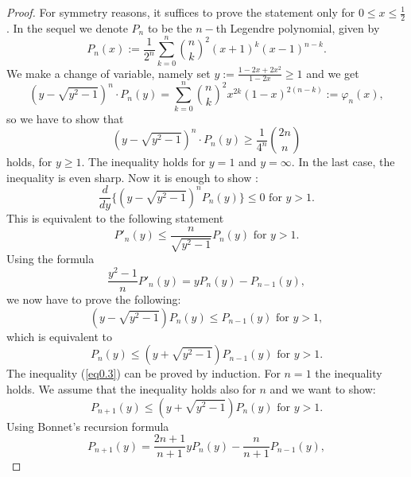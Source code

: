 \documentclass[12pt,leqno,a4paper,dvips,twoside]{article}
\begin{document}
{\begin{proof}
	For symmetry reasons, it suffices to prove the statement only for $0\leq x\leq\frac{1}{2}$. 
	In the sequel we denote $P_n$ to be the $n-$th Legendre polynomial, given by
		\begin{equation*}
			P_n(x):=\frac{1}{2^n}\sum^{n}_{k=0}{\binom{n}{k}}^2(x+1)^k(x-1)^{n-k}.
		\end{equation*}
	We make a change of variable, namely set $y:=\frac{1-2x+2x^2}{1-2x}\geq 1$ and we get
		\begin{equation*}
			(y-\sqrt{y^2-1})^n\cdot P_n(y)=\sum^{n}_{k=0}{\binom{n}{k}}^2x^{2k}(1-x)^{2(n-k)}:=\varphi_n(x),
		\end{equation*}
	so we have to show that
		\begin{equation*}
			(y-\sqrt{y^2-1})^n\cdot P_n(y)\geq \frac{1}{4^n}\binom{2n}{n}
		\end{equation*}
	holds, for $y\geq 1$. The inequality holds for $y=1$ and $y=\infty$. In the last case, the inequality is even sharp. 
	Now it is enough to show :
		\begin{equation*}
			\frac{d}{dy}\{(y-\sqrt{y^2-1})^nP_n(y)\}\leq 0 \text{ for } y>1. 
		\end{equation*}
	This is equivalent to the following statement
		\begin{equation*}
			P'_n(y)\leq \frac{n}{\sqrt{y^2-1}}P_n(y) \text{ for } y>1.
		\end{equation*}
	Using the formula
		\begin{equation*}
			\frac{y^2-1}{n}P'_n(y)=yP_n(y)-P_{n-1}(y),
		\end{equation*}
	we now have to prove the following:
		\begin{equation*}
			(y-\sqrt{y^2-1})P_n(y)\leq P_{n-1}(y) \text{ for } y>1,
		\end{equation*}
	which is equivalent to
		\begin{equation}\label{eq0.3}
			P_n(y)\leq (y+\sqrt{y^2-1})P_{n-1}(y) \text{ for } y>1.
		\end{equation}
	The inequality (\ref{eq0.3}) can be proved by induction. For $n=1$ the inequality holds. We assume that the inequality holds also for $n$ and 
	we want to show:
		\begin{equation*}
			P_{n+1}(y)\leq (y+\sqrt{y^2-1})P_n(y) \text{ for } y>1.
		\end{equation*}
	Using Bonnet's recursion formula
		\begin{equation*}
			P_{n+1}(y)=\frac{2n+1}{n+1}yP_n(y)-\frac{n}{n+1}P_{n-1}(y),
		\end{equation*}

\end{proof}}
\end{document}
